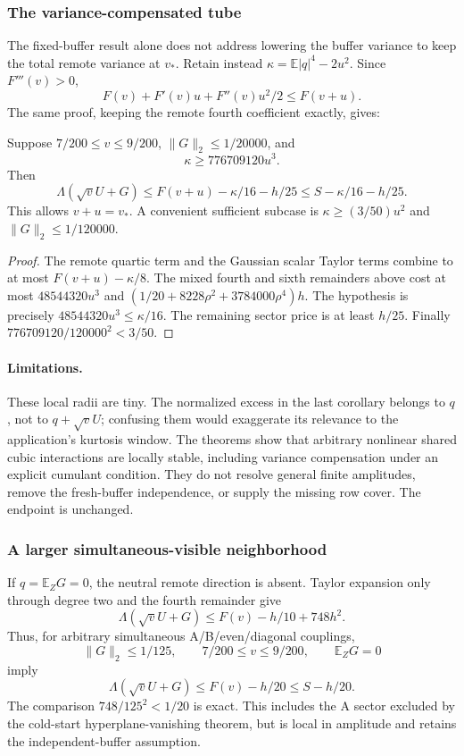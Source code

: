 \subsubsection{The variance-compensated tube}
The fixed-buffer result alone does not address lowering the buffer
variance to keep the total remote variance at $v_*$. Retain instead
$\kappa=\mathbb E|q|^4-2u^2$. Since $F'''(v)>0$,
\[
 F(v)+F'(v)u+F''(v)u^2/2\le F(v+u).
\]
The same proof, keeping the remote fourth coefficient exactly, gives:
\begin{theorem}\label{thm:buffered-compensated}
Suppose $7/200\le v\le9/200$, $\|G\|_2\le1/20000$, and
\[
 \kappa\ge776709120u^3.
\]
Then
\[
 \boxed{\Lambda(\sqrt vU+G)\le F(v+u)-\kappa/16-h/25
 \le S-\kappa/16-h/25.}
\]
This allows $v+u=v_*$. A convenient sufficient subcase is
$\kappa\ge(3/50)u^2$ and $\|G\|_2\le1/120000$.
\end{theorem}
\begin{proof}
The remote quartic term and the Gaussian scalar Taylor terms combine
to at most $F(v+u)-\kappa/8$. The mixed fourth and sixth remainders
above cost at most $48544320u^3$ and
$(1/20+8228\rho^2+3784000\rho^4)h$. The hypothesis is precisely
$48544320u^3\le\kappa/16$. The remaining sector price is at least
$h/25$. Finally $776709120/120000^2<3/50$.
\end{proof}

\paragraph{Limitations.}
These local radii are tiny. The normalized excess in the last corollary
belongs to $q$, not to $q+\sqrt vU$; confusing them would exaggerate
its relevance to the application's kurtosis window. The theorems show
that arbitrary nonlinear shared cubic interactions are locally stable,
including variance compensation under an explicit cumulant condition.
They do not resolve general finite amplitudes, remove the fresh-buffer
independence, or supply the missing row cover. The endpoint is unchanged.

\subsubsection{A larger simultaneous-visible neighborhood}
If $q=\mathbb E_ZG=0$, the neutral remote direction is absent.
Taylor expansion only through degree two and the fourth remainder give
\[
 \Lambda(\sqrt vU+G)\le F(v)-h/10+748h^2.
\]
Thus, for arbitrary simultaneous A/B/even/diagonal couplings,
\[
 \|G\|_2\le1/125,\qquad 7/200\le v\le9/200,
 \qquad\mathbb E_ZG=0
\]
imply
\[
 \boxed{\Lambda(\sqrt vU+G)\le F(v)-h/20\le S-h/20.}
\]
The comparison $748/125^2<1/20$ is exact. This includes the A sector
excluded by the cold-start hyperplane-vanishing theorem, but is local
in amplitude and retains the independent-buffer assumption.

